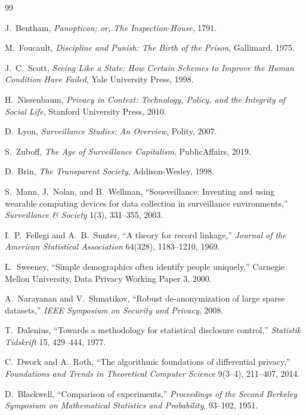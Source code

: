 \documentclass[11pt]{article}
\theoremstyle{plain}
\theoremstyle{definition}
\theoremstyle{remark}
\begin{document}
\begin{thebibliography}{99}
\small

 J.~Bentham, \emph{Panopticon; or, The Inspection-House}, 1791.

 M.~Foucault, \emph{Discipline and Punish: The Birth of the Prison}, Gallimard, 1975.

 J.~C.~Scott, \emph{Seeing Like a State: How Certain Schemes to Improve the Human Condition Have Failed}, Yale University Press, 1998.

 H.~Nissenbaum, \emph{Privacy in Context: Technology, Policy, and the Integrity of Social Life}, Stanford University Press, 2010.

 D.~Lyon, \emph{Surveillance Studies: An Overview}, Polity, 2007.

 S.~Zuboff, \emph{The Age of Surveillance Capitalism}, PublicAffairs, 2019.

 D.~Brin, \emph{The Transparent Society}, Addison-Wesley, 1998.

 S.~Mann, J.~Nolan, and B.~Wellman, ``Sousveillance: Inventing and using wearable computing devices for data collection in surveillance environments,'' \emph{Surveillance \& Society} 1(3), 331--355, 2003.

 I.~P.~Fellegi and A.~B.~Sunter, ``A theory for record linkage,'' \emph{Journal of the American Statistical Association} 64(328), 1183--1210, 1969.

 L.~Sweeney, ``Simple demographics often identify people uniquely,'' Carnegie Mellon University, Data Privacy Working Paper 3, 2000.

 A.~Narayanan and V.~Shmatikov, ``Robust de-anonymization of large sparse datasets,'' \emph{IEEE Symposium on Security and Privacy}, 2008.

 T.~Dalenius, ``Towards a methodology for statistical disclosure control,'' \emph{Statistik Tidskrift} 15, 429--444, 1977.

 C.~Dwork and A.~Roth, ``The algorithmic foundations of differential privacy,'' \emph{Foundations and Trends in Theoretical Computer Science} 9(3--4), 211--407, 2014.

 D.~Blackwell, ``Comparison of experiments,'' \emph{Proceedings of the Second Berkeley Symposium on Mathematical Statistics and Probability}, 93--102, 1951.


\end{thebibliography}
\end{document}
